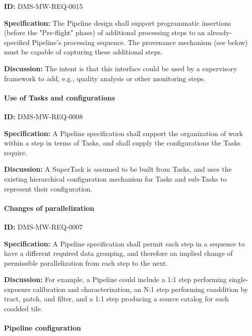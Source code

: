 \documentclass[SE,toc,lsstdraft]{lsstdoc}
\begin{document}
\label{DMS-MW-REQ-0015}
\textbf{ID:} DMS-MW-REQ-0015

\textbf{Specification:}
The Pipeline design shall support programmatic insertions (before the "Pre-flight" phase) of additional processing steps to an already-specified Pipeline’s processing sequence. The provenance mechanism (see below) must be capable of capturing these additional steps.

\textbf{Discussion:}
The intent is that this interface could be used by a supervisory framework to add, e.g., quality analysis or other monitoring steps.

\paragraph{Use of Tasks and configurations}\hfill  %

\label{DMS-MW-REQ-0008}
\textbf{ID:} DMS-MW-REQ-0008

\textbf{Specification:}
A Pipeline specification shall support the organization of work within a step in terms of Tasks, and shall supply the configurations the Tasks require.

\textbf{Discussion:}
A SuperTask is assumed to be built from Tasks, and uses the existing hierarchical configuration mechanism for Tasks and sub-Tasks to represent their configuration.

\paragraph{Changes of parallelization}\hfill  %

\label{DMS-MW-REQ-0007}
\textbf{ID:} DMS-MW-REQ-0007

\textbf{Specification:}
A Pipeline specification shall permit each step in a sequence to have a different required data grouping, and therefore an implied change of permissible parallelization from each step to the next.

\textbf{Discussion:}
For example, a Pipeline could include a 1:1 step performing single-exposure calibration and characterization, an N:1 step performing coaddition by tract, patch, and filter, and a 1:1 step producing a source catalog for each coadded tile.

\paragraph{Pipeline configuration}\hfill  %
\end{document}
